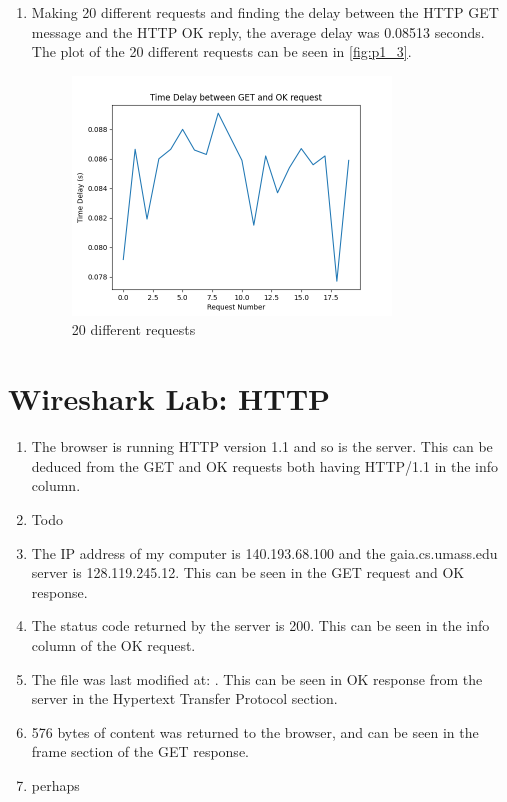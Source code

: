 \documentclass{article}
\begin{document}
\begin{enumerate}
    \item Making 20 different requests and finding the delay between the HTTP GET message and the HTTP OK reply, the average delay was 0.08513 seconds. The plot of the 20 different requests can be seen in \autoref{fig:p1_3}.
    
    \begin{figure}[ht!]
        \centering
        \includegraphics[width=0.8\textwidth]{p1_3}
        \caption{20 different requests}
        \label{fig:p1_3}
    \end{figure}
\end{enumerate}

\newpage
\section{Wireshark Lab: HTTP}

\begin{enumerate}
    \item The browser is running HTTP version 1.1 and so is the server. This can be deduced from the GET and OK requests both having HTTP/1.1 in the info column.
    \item Todo
    \item The IP address of my computer is 140.193.68.100 and the gaia.cs.umass.edu server is 128.119.245.12. This can be seen in the GET request and OK response.
    \item The status code returned by the server is 200. This can be seen in the info column of the OK request.
    \item The file was last modified at: . This can be seen in OK response from the server in the Hypertext Transfer Protocol section.
    \item 576 bytes of content was returned to the browser, and can be seen in the frame section of the GET response.
    \item perhaps
\end{enumerate}
\end{document}
